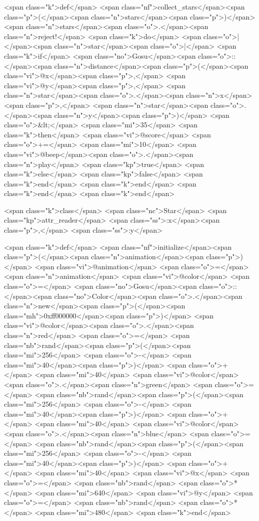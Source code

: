 \begin{rawhtml}
  <span class="k">def</span> <span class="nf">collect_stars</span><span class="p">(</span><span class="n">stars</span><span class="p">)</span>
    <span class="n">stars</span><span class="o">.</span><span class="n">reject!</span> <span class="k">do</span> <span class="o">|</span><span class="n">star</span><span class="o">|</span>
      <span class="k">if</span> <span class="no">Gosu</span><span class="o">::</span><span class="n">distance</span><span class="p">(</span><span class="vi">@x</span><span class="p">,</span> <span class="vi">@y</span><span class="p">,</span> <span class="n">star</span><span class="o">.</span><span class="n">x</span><span class="p">,</span> <span class="n">star</span><span class="o">.</span><span class="n">y</span><span class="p">)</span> <span class="o">&lt;</span> <span class="mi">35</span> <span class="k">then</span>
        <span class="vi">@score</span> <span class="o">+=</span> <span class="mi">10</span>
        <span class="vi">@beep</span><span class="o">.</span><span class="n">play</span>
        <span class="kp">true</span>
      <span class="k">else</span>
        <span class="kp">false</span>
      <span class="k">end</span>
    <span class="k">end</span>
  <span class="k">end</span>
<span class="k">end</span>

<span class="k">class</span> <span class="nc">Star</span>
  <span class="kp">attr_reader</span> <span class="ss">:x</span><span class="p">,</span> <span class="ss">:y</span>
  
  <span class="k">def</span> <span class="nf">initialize</span><span class="p">(</span><span class="n">animation</span><span class="p">)</span>
    <span class="vi">@animation</span> <span class="o">=</span> <span class="n">animation</span>
    <span class="vi">@color</span> <span class="o">=</span> <span class="no">Gosu</span><span class="o">::</span><span class="no">Color</span><span class="o">.</span><span class="n">new</span><span class="p">(</span><span class="mh">0xff000000</span><span class="p">)</span>
    <span class="vi">@color</span><span class="o">.</span><span class="n">red</span> <span class="o">=</span> <span class="nb">rand</span><span class="p">(</span><span class="mi">256</span> <span class="o">-</span> <span class="mi">40</span><span class="p">)</span> <span class="o">+</span> <span class="mi">40</span>
    <span class="vi">@color</span><span class="o">.</span><span class="n">green</span> <span class="o">=</span> <span class="nb">rand</span><span class="p">(</span><span class="mi">256</span> <span class="o">-</span> <span class="mi">40</span><span class="p">)</span> <span class="o">+</span> <span class="mi">40</span>
    <span class="vi">@color</span><span class="o">.</span><span class="n">blue</span> <span class="o">=</span> <span class="nb">rand</span><span class="p">(</span><span class="mi">256</span> <span class="o">-</span> <span class="mi">40</span><span class="p">)</span> <span class="o">+</span> <span class="mi">40</span>
    <span class="vi">@x</span> <span class="o">=</span> <span class="nb">rand</span> <span class="o">*</span> <span class="mi">640</span>
    <span class="vi">@y</span> <span class="o">=</span> <span class="nb">rand</span> <span class="o">*</span> <span class="mi">480</span>
  <span class="k">end</span>


\end{rawhtml}
